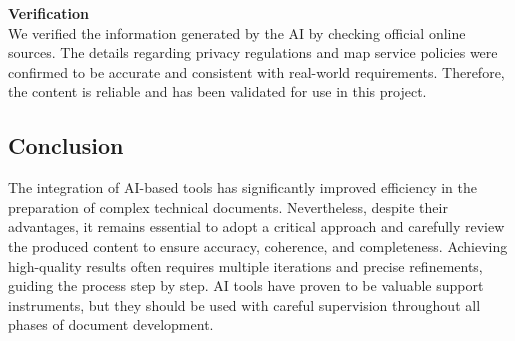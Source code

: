 \vspace{0.5cm}

\noindent \textbf{Verification} \\
We verified the information generated by the AI by checking official online sources. The details regarding privacy regulations and map service policies were confirmed to be accurate and consistent with real-world requirements. Therefore, the content is reliable and has been validated for use in this project.

\subsection{Conclusion}
The integration of AI-based tools has significantly improved efficiency in the preparation of complex technical documents. Nevertheless, despite their advantages, it remains essential to adopt a critical approach and carefully review the produced content to ensure accuracy, coherence, and completeness. Achieving high-quality results often requires multiple iterations and precise refinements, guiding the process step by step. AI tools have proven to be valuable support instruments, but they should be used with careful supervision throughout all phases of document development.